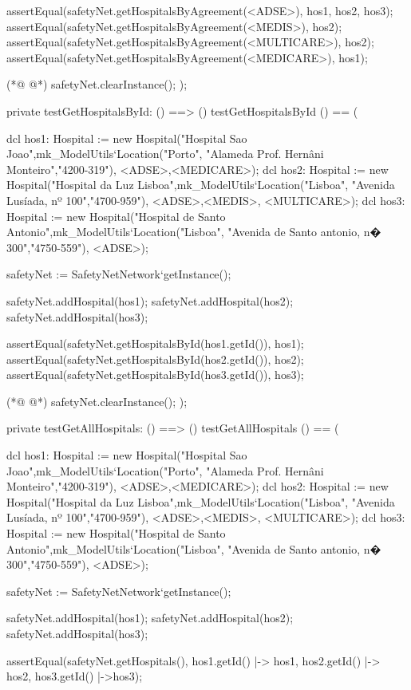 \begin{vdmpp}[breaklines=true]
  assertEqual(safetyNet.getHospitalsByAgreement(<ADSE>), {hos1, hos2, hos3});
  assertEqual(safetyNet.getHospitalsByAgreement(<MEDIS>), {hos2});
  assertEqual(safetyNet.getHospitalsByAgreement(<MULTICARE>), {hos2});
  assertEqual(safetyNet.getHospitalsByAgreement(<MEDICARE>), {hos1});
  
(*@
\label{testGetHospitalsByName:352}
@*)
  safetyNet.clearInstance();
);

private testGetHospitalsById: () ==> ()
 testGetHospitalsById () == (
   
  dcl hos1: Hospital := new Hospital("Hospital Sao Joao",mk_ModelUtils`Location("Porto", "Alameda Prof. Hernâni Monteiro","4200-319"), {<ADSE>,<MEDICARE>});
  dcl hos2: Hospital := new Hospital("Hospital da Luz Lisboa",mk_ModelUtils`Location("Lisboa", "Avenida Lusíada, nº 100","4700-959"), {<ADSE>,<MEDIS>, <MULTICARE>});
  dcl hos3: Hospital := new Hospital("Hospital de Santo Antonio",mk_ModelUtils`Location("Lisboa", "Avenida de Santo antonio, n� 300","4750-559"), {<ADSE>});
  
  safetyNet := SafetyNetNetwork`getInstance();
   
  safetyNet.addHospital(hos1);
  safetyNet.addHospital(hos2);
  safetyNet.addHospital(hos3);
 
  assertEqual(safetyNet.getHospitalsById(hos1.getId()), hos1);
  assertEqual(safetyNet.getHospitalsById(hos2.getId()), hos2);
  assertEqual(safetyNet.getHospitalsById(hos3.getId()), hos3);
 
(*@
\label{testGetDoctorHospitals:372}
@*)
  safetyNet.clearInstance();
);

private testGetAllHospitals: () ==> ()
 testGetAllHospitals () == (
  
  dcl hos1: Hospital := new Hospital("Hospital Sao Joao",mk_ModelUtils`Location("Porto", "Alameda Prof. Hernâni Monteiro","4200-319"), {<ADSE>,<MEDICARE>});
  dcl hos2: Hospital := new Hospital("Hospital da Luz Lisboa",mk_ModelUtils`Location("Lisboa", "Avenida Lusíada, nº 100","4700-959"), {<ADSE>,<MEDIS>, <MULTICARE>});
  dcl hos3: Hospital := new Hospital("Hospital de Santo Antonio",mk_ModelUtils`Location("Lisboa", "Avenida de Santo antonio, n� 300","4750-559"), {<ADSE>});
  
  safetyNet := SafetyNetNetwork`getInstance();
   
  safetyNet.addHospital(hos1);
  safetyNet.addHospital(hos2);
  safetyNet.addHospital(hos3);
 
  assertEqual(safetyNet.getHospitals(), {hos1.getId() |-> hos1, hos2.getId() |-> hos2, hos3.getId() |->hos3});
 

\end{vdmpp}
